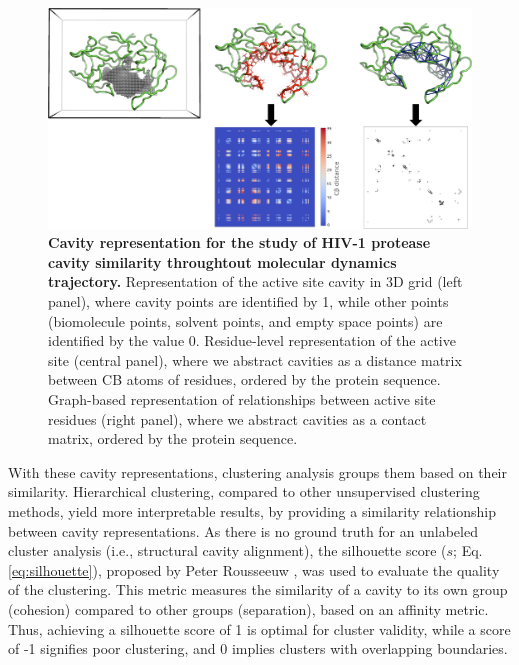 \documentclass[Ingles]{phdthesis}
\def\ie{i.e.\onedot}
\begin{document}
\begin{figure}[h]
  \centering
  \includegraphics[scale=1]{images/HIV-1-representation.png}
  \caption[Cavity representation for the study of HIV-1 protease cavity similarity throughtout molecular dynamics trajectory]{\textbf{Cavity representation for the study of HIV-1 protease cavity similarity throughtout molecular dynamics trajectory.} Representation of the active site cavity in 3D grid (left panel), where cavity points are identified by 1, while other points (biomolecule points, solvent points, and empty space points) are identified by the value 0. Residue-level representation of the active site (central panel), where we abstract cavities as a distance matrix between \acs{CB} atoms of residues, ordered by the protein sequence. Graph-based representation of relationships between active site residues (right panel), where we abstract cavities as a contact matrix, ordered by the protein sequence.}
  \label{fig:hiv-1-representation}
\end{figure}

With these cavity representations, clustering analysis groups them based on their similarity. Hierarchical clustering, compared to other unsupervised clustering methods, yield more interpretable results, by providing a similarity relationship between cavity representations. As there is no ground truth for an unlabeled cluster analysis (\ie, structural cavity alignment), the silhouette score ($s$; Eq. \ref{eq:silhouette}), proposed by Peter Rousseeuw \cite{rousseeuw1987}, was used to evaluate the quality of the clustering. This metric measures the similarity of a cavity to its own group (cohesion) compared to other groups (separation), based on an affinity metric. Thus, achieving a silhouette score of 1 is optimal for cluster validity, while a score of -1 signifies poor clustering, and 0 implies clusters with overlapping boundaries.
\end{document}
